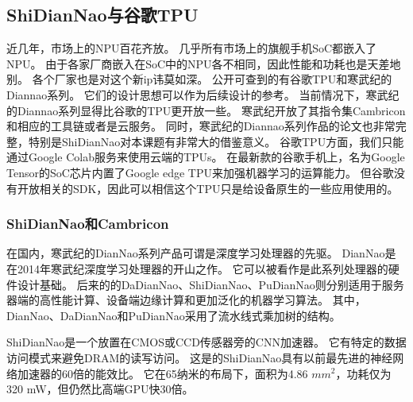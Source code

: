 \subsection{ShiDianNao与谷歌TPU}
近几年，市场上的NPU百花齐放。
几乎所有市场上的旗舰手机SoC都嵌入了NPU。
由于各家厂商嵌入在SoC中的NPU各不相同，因此性能和功耗也是天差地别。
各个厂家也是对这个新ip讳莫如深。
公开可查到的有谷歌TPU和寒武纪的Diannao系列。
它们的设计思想可以作为后续设计的参考。
当前情况下，寒武纪的Diannao系列显得比谷歌的TPU更开放一些。
寒武纪开放了其指令集Cambricon和相应的工具链或者是云服务。
同时，寒武纪的Diannao系列作品的论文也非常完整，特别是ShiDianNao对本课题有非常大的借鉴意义。
谷歌TPU方面，我们只能通过Google Colab服务来使用云端的TPUs。
在最新款的谷歌手机上，名为Google Tensor的SoC芯片内置了Google edge TPU来加强机器学习的运算能力。
但谷歌没有开放相关的SDK，因此可以相信这个TPU只是给设备原生的一些应用使用的。


\subsubsection{ShiDianNao和Cambricon}
在国内，寒武纪的DianNao系列产品可谓是深度学习处理器的先驱。
DianNao是在2014年寒武纪深度学习处理器的开山之作。
它可以被看作是此系列处理器的硬件设计基础。
后来的的DaDianNao、ShiDianNao、PuDianNao则分别适用于服务器端的高性能计算、设备端边缘计算和更加泛化的机器学习算法。
其中，DianNao、DaDianNao和PuDianNao采用了流水线式乘加树的结构。  %


ShiDianNao是一个放置在CMOS或CCD传感器旁的CNN加速器。
它有特定的数据访问模式来避免DRAM的读写访问。
这是的ShiDianNao具有以前最先进的神经网络加速器的60倍的能效比。
它在65纳米的布局下，面积为4.86 $mm^2$，功耗仅为320 mW，但仍然比高端GPU快30倍。

